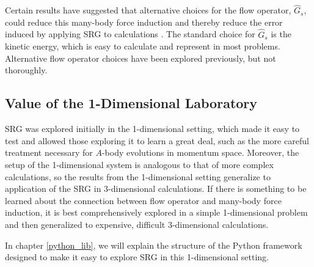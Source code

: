 Certain results have suggested that alternative choices for the flow operator, $\hat{G}_s$, could reduce this many-body force induction and thereby reduce the error induced by applying SRG to calculations \cite{Dicaire:2014fra}. The standard choice for $\hat{G}_s$ is the kinetic energy, which is easy to calculate and represent in most problems. Alternative flow operator choices have been explored previously, but not thoroughly.

\subsection{Value of the 1-Dimensional Laboratory}

SRG was explored initially in the 1-dimensional setting, which made it easy to test and allowed those exploring it to learn a great deal, such as the more careful treatment necessary for $A$-body evolutions in momentum space. Moreover, the setup of the 1-dimensional system is analogous to that of more complex calculations, so the results from the 1-dimensional setting generalize to application of the SRG in 3-dimensional calculations. If there is something to be learned about the connection between flow operator and many-body force induction, it is best comprehensively explored in a simple 1-dimensional problem and then generalized to expensive, difficult 3-dimensional calculations.

In chapter \ref{python_lib}, we will explain the structure of the Python framework designed to make it easy to explore SRG in this 1-dimensional setting.
